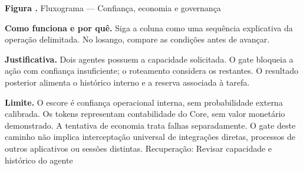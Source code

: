 {\small\textbf{Figura \thefigure.} Fluxograma --- Confiança, economia e governança}\par\smallskip
\noindent\textbf{Como funciona e por quê.} Siga a coluna como uma sequência explicativa da operação delimitada. No losango, compare as condições antes de avançar.\par
\noindent\textbf{Justificativa.} Dois agentes possuem a capacidade solicitada. O gate bloqueia a ação com confiança insuficiente; o roteamento considera os restantes. O resultado posterior alimenta o histórico interno e a reserva associada à tarefa.\par
\noindent\textbf{Limite.} O escore é confiança operacional interna, sem probabilidade externa calibrada. Os tokens representam contabilidade do Core, sem valor monetário demonstrado. A tentativa de economia trata falhas separadamente. O gate deste caminho não implica interceptação universal de integrações diretas, processos de outros aplicativos ou sessões distintas. Recuperação: Revisar capacidade e histórico do agente\par\smallskip
{}
